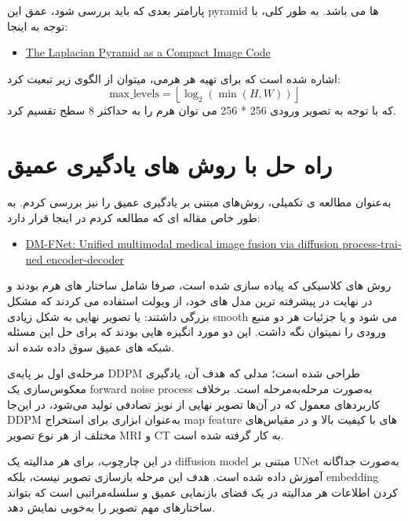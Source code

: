 \documentclass[a4paper,12pt]{article}
\begin{document}
پارامتر بعدی که باید بررسی شود، عمق این pyramid ها می باشد. به طور کلی، با توجه به اینجا:
\begin{latin}
	\begin{itemize}
		\item \href{https://ieeexplore.ieee.org/document/1095851}{The Laplacian Pyramid as a Compact Image Code}
	\end{itemize}
\end{latin}
اشاره شده است که برای تهیه هر هرمی، میتوان از الگوی زیر تبعیت کرد:
\[
\text{max\_levels} = \left\lfloor \log_2\left(\min(H, W)\right) \right\rfloor
\]
که با توجه به تصویر ورودی 256 * 256 می توان هرم را به حداکثر 8 سطح تقسیم کرد. 


\pagebreak
\section*{راه حل با روش های یادگیری عمیق}

به‌عنوان مطالعه ی تکمیلی، روش‌های مبتنی بر یادگیری عمیق را نیز بررسی کردم. به طور خاص مقاله ای که مطالعه کردم در اینجا قرار دارد:

\begin{latin}
\begin{itemize}
\item \href{https://arxiv.org/html/2506.15218v1}{DM-FNet: Unified multimodal medical image fusion via diffusion process-trained encoder-decoder}
\end{itemize}
\end{latin}
 
 روش های کلاسیکی که پیاده سازی شده است، صرفا شامل ساختار های هرم بودند و در نهایت در پیشرفته ترین مدل های خود، از ویولت استفاده می کردند که مشکل بزرگی داشتند:
 یا تصویر نهایی به شکل زیادی smooth می شود و یا جزئیات هر دو منبع ورودی را نمیتوان نگه داشت.
 این دو مورد انگیزه هایی بودند که برای حل این مسئله شبکه های عمیق سوق داده شده اند.
 
 
 مرحله‌ی اول بر پایه‌ی DDPM طراحی شده است؛ مدلی که هدف آن، یادگیری معکوس‌سازی یک forward noise process به‌صورت مرحله‌به‌مرحله است. برخلاف کاربردهای معمول که در آن‌ها تصویر نهایی از نویز تصادفی تولید می‌شود، در این‌جا DDPM به‌عنوان ابزاری برای استخراج  map feature ‌های با کیفیت بالا و در مقیاس‌های مختلف از هر نوع تصویر MRI و CT به کار گرفته شده است.
 
 در این چارچوب، برای هر مدالیته یک diffusion model مبتنی بر UNet به‌صورت جداگانه آموزش داده شده است. هدف این مرحله بازسازی تصویر نیست، بلکه embedding کردن اطلاعات هر مدالیته در یک فضای بازنمایی عمیق و سلسله‌مراتبی است که بتواند ساختارهای مهم تصویر را به‌خوبی نمایش دهد.
 
\end{document}
